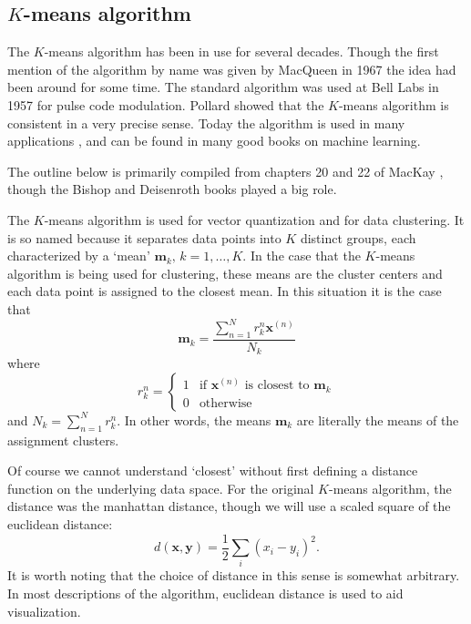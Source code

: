 
\subsection{$K$-means algorithm}\label{kmeans}
The $K$-means algorithm has been in use for several decades.  Though the first 
mention of the algorithm by name was given by MacQueen in 1967 \cite{
macqueen1967kmeans} the idea had been around for some time.  The standard  
algorithm was used at Bell Labs in 1957 \cite{Lloyd82} for pulse code 
modulation.  Pollard \cite{pollard1981,pollard1982} showed that the $K$-means 
algorithm is consistent in a very precise sense.  Today the algorithm is used 
in many applications \cite{AutoClass1,AutoClass2}, and can be found in many 
good books on machine learning.
\cite{Bishop1995,MacKay2002,BishopBook,hastie09esl,MML_2019}

The outline below is primarily compiled from chapters 20 and 22 of MacKay
\cite{MacKay2002}, though the Bishop and Deisenroth books 
\cite{BishopBook,MML_2019} played a big role.  

The \(K\)-means algorithm is used for vector quantization and for data 
clustering.  It is so named because it separates data points into $K$ distinct 
groups, each characterized by a `mean' \(\bm m_k,\, k= 1,\ldots,K\).  In the 
case that the \(K\)-means algorithm is being used for clustering, these means 
are the cluster centers and each data point is assigned to the closest mean.
In this situation it is the case that 
\[\bm m_k = \frac{\sum_{n=1}^{N} r_k^n \bm x^{(n)}}{N_k}\]
where 
\begin{equation*}
r^n_k = \begin{cases}
			1 & \text{if } \bm x^{(n)} \text{ is closest to } \bm m_k\\
			0 & \text{otherwise}
		\end{cases}
\end{equation*}
and \(N_k = \sum_{n=1}^{N} r^n_k\).  In other words, the means \(\bm m_k\) are 
literally the means of the assignment clusters.

Of course we cannot understand `closest' without first defining a distance 
function  on the underlying data space.  For the original \(K\)-means 
algorithm, the distance was the manhattan distance, though we will use a 
scaled square of the euclidean distance:
\[d(\bm x, \bm y) = \frac 12 \sum_i (x_i-y_i)^2.\]
It is worth noting that the choice of distance in this sense is somewhat 
arbitrary. In most descriptions of the algorithm, euclidean distance is used 
to aid visualization.

